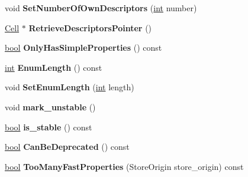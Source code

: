 \begin{DoxyCompactItemize}
\item 
\mbox{\label{classv8_1_1internal_1_1Map_a6dcbe6ad0bd9b7e7db9e4b8d0c9c10c3}} 
void {\bfseries Set\+Number\+Of\+Own\+Descriptors} (\mbox{\hyperlink{classint}{int}} number)
\item 
\mbox{\label{classv8_1_1internal_1_1Map_a0b8b0aaeb7369127735a934852770063}} 
\mbox{\hyperlink{classv8_1_1internal_1_1Cell}{Cell}} $\ast$ {\bfseries Retrieve\+Descriptors\+Pointer} ()
\item 
\mbox{\label{classv8_1_1internal_1_1Map_a8190b508e860df4f0fc013734fae9121}} 
\mbox{\hyperlink{classbool}{bool}} {\bfseries Only\+Has\+Simple\+Properties} () const
\item 
\mbox{\label{classv8_1_1internal_1_1Map_af59b008a990e9883a48a309d0ece55f4}} 
\mbox{\hyperlink{classint}{int}} {\bfseries Enum\+Length} () const
\item 
\mbox{\label{classv8_1_1internal_1_1Map_a09932f1a95aa75946acba84a0c90678a}} 
void {\bfseries Set\+Enum\+Length} (\mbox{\hyperlink{classint}{int}} length)
\item 
\mbox{\label{classv8_1_1internal_1_1Map_ae4c34a731c5dcbe79b61c141385b78f2}} 
void {\bfseries mark\+\_\+unstable} ()
\item 
\mbox{\label{classv8_1_1internal_1_1Map_a5f24c2affbd2375072c483045d20c6eb}} 
\mbox{\hyperlink{classbool}{bool}} {\bfseries is\+\_\+stable} () const
\item 
\mbox{\label{classv8_1_1internal_1_1Map_aeeaf8f3d64f3d6cb50a88eb882cff3d9}} 
\mbox{\hyperlink{classbool}{bool}} {\bfseries Can\+Be\+Deprecated} () const
\item 
\mbox{\label{classv8_1_1internal_1_1Map_aaab898400fd9be96c0ddffbc52088c11}} 
\mbox{\hyperlink{classbool}{bool}} {\bfseries Too\+Many\+Fast\+Properties} (Store\+Origin store\+\_\+origin) const
\item 
\mbox{\label{classv8_1_1internal_1_1Map_ae32014fe26612f64ed211e33f15d2925}} 

\end{DoxyCompactItemize}
